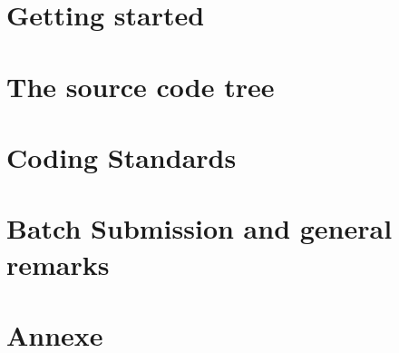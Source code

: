 \documentclass[11pt,a4paper]{report}
\begin{document}
%
%
\chapter{Getting started}
\label{ch:start}



%
%
\chapter{The source code tree}
\label{ch:tree}



%
%
\chapter{Coding Standards}
\label{ch:CS}


%
%
\chapter{Batch Submission and general remarks}
\label{ch:Batch}


%
%
\chapter{Annexe}
\label{ch:Annexe}




\
\end{document}
